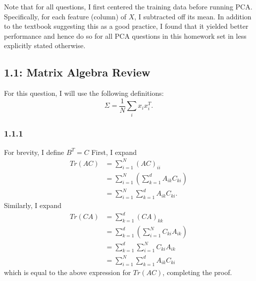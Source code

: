 \documentclass[12pt]{amsart}
\begin{document}
Note that for all questions, I first centered the training data before running PCA.  Specifically, for each feature (column) of $X$, I subtracted off its mean.  In addition to the textbook suggesting this as a good practice, I found that it yielded better performance and hence do so for all PCA questions in this homework set in less explicitly stated otherwise.

\subsection*{1.1: Matrix Algebra Review}
For this question, I will use the following definitions:
\begin{equation} \label{eqn:sigma}
\Sigma = \frac{1}{N}\sum_i x_i x_i^T.
\end{equation}

\subsubsection*{1.1.1}
For brevity, I define $B^T = C$  First, I expand
\begin{equation}
\begin{split}
Tr(AC) & = \sum_{i = 1}^N (AC)_{ii} \\
& = \sum_{i = 1}^N \left( \sum_{k = 1}^d A_{ik}C_{ki} \right) \\
& = \sum_{i = 1}^N \sum_{k = 1}^d A_{ik}C_{ki}.
\end{split}
\end{equation}
Similarly, I expand
\begin{equation}
\begin{split}
Tr(CA) & = \sum_{k = 1}^d (CA)_{kk} \\
& = \sum_{k = 1}^d \left( \sum_{i = 1}^N C_{ki}A_{ik} \right) \\
& = \sum_{k = 1}^d \sum_{i = 1}^N C_{ki}A_{ik} \\
& = \sum_{i = 1}^N \sum_{k = 1}^d A_{ik}C_{ki}
\end{split}
\end{equation}
which is equal to the above expression for $Tr(AC)$, completing the proof.
\end{document}

